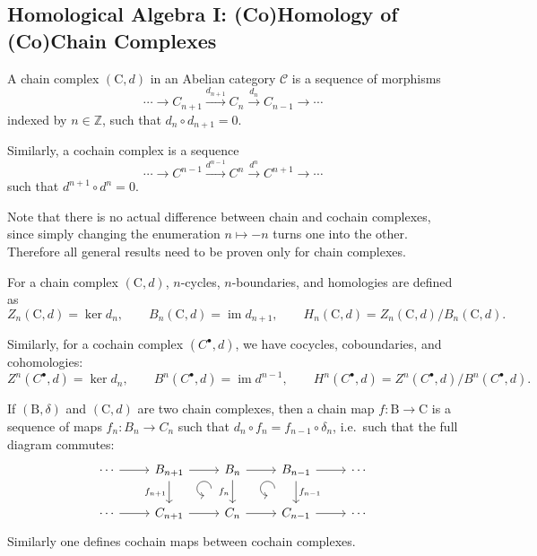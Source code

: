 \documentclass[english,letterpaper]{article}%
\numberwithin{equation}{section}
\numberwithin{figure}{section}
\numberwithin{table}{section}
\theoremstyle{definition}
\theoremstyle{definition}
\theoremstyle{definition}
\theoremstyle{plain}
\theoremstyle{plain}
\theoremstyle{plain}
\theoremstyle{plain}
\theoremstyle{remark}
\theoremstyle{remark}
\newcommand{\bbZ}{\mathbb{Z}}
\newcommand{\calC}{\mathcal{C}}
\newcommand{\bm}[1]{\boldsymbol{\mathrm{#1}}}
\DeclareMathOperator{\im}{im}
\begin{document}
\subsection{Homological Algebra I: (Co)Homology of (Co)Chain Complexes}

\begin{defn}
    A chain complex $(\bm{C},d)$ in an Abelian category $\calC$ is a sequence  of morphisms 
    \[\cdots\to C_{n+1}\overset{d_{n+1}}\to C_n\overset{d_n}\to C_{n-1}\to\cdots\]
    indexed by $n\in \bbZ$, such that $d_n\circ d_{n+1}=0$.
    
    Similarly, a cochain complex is a sequence
    \[\cdots\to C^{n-1}\overset{d^{n-1}}\to C^n\overset{d^n}\to C^{n+1}\to\cdots\]
    such that $d^{n+1}\circ d^n=0$.
\end{defn}

Note that there is no actual difference between chain and cochain complexes, since simply changing the enumeration $n\mapsto -n$ turns one into the other. Therefore all general results need to be proven only for chain complexes.

\begin{defn}
    For a chain complex $(\bm{C},d)$, $n$-cycles, $n$-boundaries, and homologies are defined as 
    \[Z_n(\bm{C},d)=\ker d_n,\quad\quad B_n(\bm{C},d)=\im d_{n+1},\quad\quad H_n(\bm{C},d)=Z_n(\bm{C},d)/B_n(\bm{C},d).\]
    
    Similarly, for a cochain complex $(C^\bullet,d)$, we have cocycles, coboundaries, and cohomologies:
    \[Z^n(C^\bullet,d)=\ker d_n,\quad\quad B^n(C^\bullet,d)=\im d^{n-1},\quad\quad H^n(C^\bullet,d)=Z^n(C^\bullet,d)/B^n(C^\bullet,d).\]
\end{defn}

\begin{defn}
    If $(\bm{B},\delta )$ and $(\bm{C},d)$ are two chain complexes, then a chain map $f:\bm{B}\to \bm{C}$ is a sequence of maps $f_n:B_n\to C_n$ such that $d_n\circ f_n=f_{n-1}\circ \delta_n$, i.e.\ such that the full diagram commutes:
    \[\begin{tikzcd}[every matrix/.append style={name=m},
        execute at end picture={\draw [<-] ([xshift=-8mm,yshift=-10mm]m-1-3.north) arc[start angle=-90,delta angle=-270,radius=0.2cm];
        \draw [<-] ([xshift=-8mm,yshift=-10mm]m-1-4.north) arc[start angle=-90,delta angle=-270,radius=0.2cm];}]
        \cdots\arrow[r] & B_{n+1}\arrow[r]\arrow[d,swap,"f_{n+1}"] & B_{n} \arrow[r]\arrow[d,swap,"f_n"] & B_{n-1}\arrow[d,"f_{n-1}"]\arrow[r] & \cdots \\
       \cdots\arrow[r] & C_{n+1}\arrow[r] & C_n\arrow[r] &C_{n-1} \arrow[r] &\cdots
    \end{tikzcd}\]
    Similarly one defines cochain maps between cochain complexes.
\end{defn}
\end{document}
